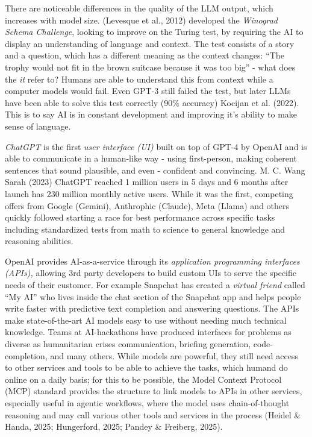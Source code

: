 \documentclass[
  letterpaper,
  DIV=11,
  numbers=noendperiod]{scrartcl}
\begin{document}
There are noticeable differences in the quality of the LLM output, which
increases with model size. (Levesque et al., 2012) developed the
\emph{Winograd Schema Challenge}, looking to improve on the Turing test,
by requiring the AI to display an understanding of language and context.
The test consists of a story and a question, which has a different
meaning as the context changes: ``The trophy would not fit in the brown
suitcase because it was too big'' - what does the \emph{it} refer to?
Humans are able to understand this from context while a computer models
would fail. Even GPT-3 still failed the test, but later LLMs have been
able to solve this test correctly (90\% accuracy) Kocijan et al. (2022).
This is to say AI is in constant development and improving it's ability
to make sense of language.

\emph{ChatGPT} is the first \emph{user interface (UI)} built on top of
GPT-4 by OpenAI and is able to communicate in a human-like way - using
first-person, making coherent sentences that sound plausible, and even -
confident and convincing. M. C. Wang Sarah (2023) ChatGPT reached 1
million users in 5 days and 6 months after launch has 230 million
monthly active users. While it was the first, competing offers from
Google (Gemini), Anthrophic (Claude), Meta (Llama) and others quickly
followed starting a race for best performance across specific tasks
including standardized tests from math to science to general knowledge
and reasoning abilities.

OpenAI provides AI-as-a-service through its \emph{application
programming interfaces (APIs),} allowing 3rd party developers to build
custom UIs to serve the specific needs of their customer. For example
Snapchat has created a \emph{virtual friend} called ``My AI'' who lives
inside the chat section of the Snapchat app and helps people write
faster with predictive text completion and answering questions. The APIs
make state-of-the-art AI models easy to use without needing much
technical knowledge. Teams at AI-hackathons have produced interfaces for
problems as diverse as humanitarian crises communication, briefing
generation, code-completion, and many others. While models are powerful,
they still need access to other services and tools to be able to achieve
the tasks, which humand do online on a daily basis; for this to be
possible, the Model Context Protocol (MCP) standard provides the
structure to link models to APIs in other services, especially useful in
agentic workflows, where the model uses chain-of-thought reasoning and
may call various other tools and services in the process (Heidel \&
Handa, 2025; Hungerford, 2025; Pandey \& Freiberg, 2025).
\end{document}
